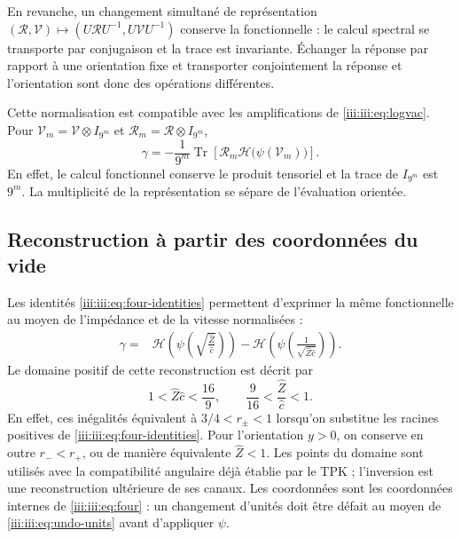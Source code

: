 En revanche, un changement simultané de représentation
$(\mathcal R,\mathcal V)\mapsto
(U\mathcal RU^{-1},U\mathcal VU^{-1})$ conserve la fonctionnelle :
le calcul spectral se transporte par conjugaison et la trace est
invariante. Échanger la réponse par rapport à une orientation fixe
et transporter conjointement la réponse et l’orientation sont donc
des opérations différentes.

Cette normalisation est compatible avec les amplifications de
\eqref{iii:iii:eq:logvac}. Pour
$\mathcal V_m=\mathcal V\otimes I_{9^m}$ et
$\mathcal R_m=\mathcal R\otimes I_{9^m}$,
\begin{equation}
 \gamma=-\frac1{9^m}\operatorname{Tr}
 \left[\mathcal R_m\mathcal H\bigl(\psi(\mathcal V_m)\bigr)\right].
 \label{iii:iii:eq:barbero-amplification}
\end{equation}
En effet, le calcul fonctionnel conserve le produit tensoriel et la trace
de $I_{9^m}$ est $9^m$. La multiplicité de la représentation se sépare
de l’évaluation orientée.

\subsection{Reconstruction à partir des coordonnées du vide}

Les identités \eqref{iii:iii:eq:four-identities} permettent d’exprimer la même
fonctionnelle au moyen de l’impédance et de la vitesse normalisées :
\begin{align}
 \gamma={}&
 \mathcal H\!\left(\psi\!\left(
     \sqrt{\frac{\widehat Z}{\widehat c}}\right)\right)
 -\mathcal H\!\left(\psi\!\left(
     \frac1{\sqrt{\widehat Z\widehat c}}\right)\right).
 \label{iii:iii:eq:barbero-zc}
\end{align}
Le domaine positif de cette reconstruction est décrit par
\begin{equation}
 1<\widehat Z\widehat c<\frac{16}{9},\qquad
 \frac9{16}<\frac{\widehat Z}{\widehat c}<1.
 \label{iii:iii:eq:barbero-zc-domain}
\end{equation}
En effet, ces inégalités équivalent à
$3/4<r_\pm<1$ lorsqu’on substitue les racines positives de
\eqref{iii:iii:eq:four-identities}. Pour l’orientation $y>0$, on conserve
en outre $r_-<r_+$, ou de manière équivalente $\widehat Z<1$. Les points du
domaine sont utilisés avec la compatibilité angulaire déjà établie par
le TPK ; l’inversion est une reconstruction ultérieure de ses canaux.
Les coordonnées sont les coordonnées internes de \eqref{iii:iii:eq:four} : un changement
d’unités doit être défait au moyen de \eqref{iii:iii:eq:undo-units} avant
d’appliquer $\psi$.


